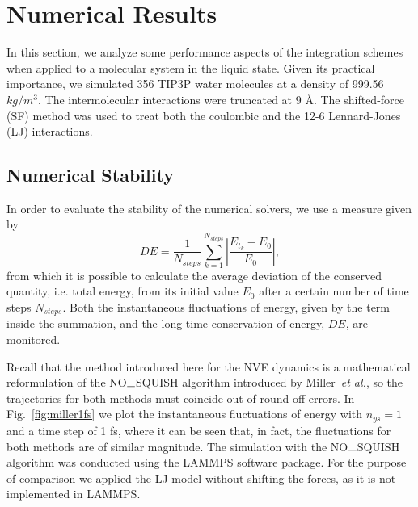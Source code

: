 \documentclass[aip,jcp,reprint,amsmath,amssymb]{revtex4-1}
\begin{document}
\section{Numerical Results}

In this section, we analyze some performance aspects of the integration schemes when applied to a molecular system in the liquid state. Given its practical importance, we simulated 356 TIP3P\cite{Price2004} water molecules at a density of 999.56 $kg/m^3$. The intermolecular interactions were truncated at 9 {\AA}. The shifted-force (SF) method\cite{Allen1989,Toxvaerd_2011} was used to treat both the coulombic and the 12-6 Lennard-Jones (LJ) interactions.

\subsection{Numerical Stability}
\label{sec:performance}

In order to evaluate the stability of the numerical solvers, we use a measure given by
\begin{equation}
\label{eq:performance}
D E =  \frac{1}{N_{steps}} \sum_{k=1}^{N_{steps}} \left| \frac{E_{t_k} - E_0}{E_0} \right|,
\end{equation}
from which it is possible to calculate the average deviation of the conserved quantity, i.e. total energy, from its initial value $E_0$ after a certain number of time steps $N_{steps}$. Both the instantaneous fluctuations of energy, given by the term inside the summation, and the long-time conservation of energy, $D E$, are monitored.  

Recall that the method introduced here for the NVE dynamics is a mathematical reformulation of the NO$\rule{0.25cm}{0.15mm}$SQUISH algorithm introduced by Miller~\textit{et al.}\cite{Miller2002}, so the trajectories for both methods must coincide out of round-off errors. In Fig.~\ref{fig:miller1fs} we plot the instantaneous fluctuations of energy with $n_{ys} = 1 $ and a time step of 1 fs, where it can be seen that, in fact, the fluctuations for both methods are of similar magnitude. The simulation with the NO$\rule{0.25cm}{0.15mm}$SQUISH algorithm was conducted using the LAMMPS\cite{Plimpton1995} software package. For the purpose of comparison we applied the LJ model without shifting the forces, as it is not implemented in LAMMPS.
\end{document}
